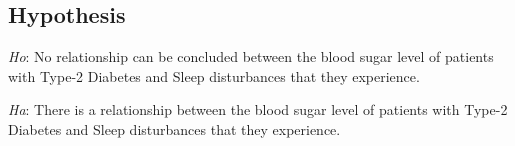 \subsection*{Hypothesis}
\noindent
\textit{Ho}: No relationship can be concluded between the blood sugar level of
patients with Type-2 Diabetes and Sleep disturbances that they experience.

\noindent
\textit{Ha}: There is a relationship between the blood sugar level of patients
with Type-2 Diabetes and Sleep disturbances that they experience.
